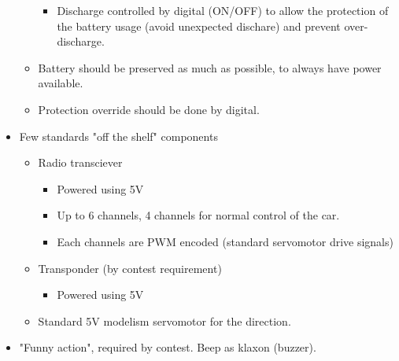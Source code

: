 \begin{itemize}
\begin{itemize}
\begin{itemize}
            \item Discharge controlled by digital (ON/OFF) to allow the protection of the battery usage (avoid unexpected dischare) and prevent over-discharge.
        \end{itemize}
        \item Battery should be preserved as much as possible, to always have power available.
        \item Protection override should be done by digital.
    \end{itemize}
    \item Few standards "off the shelf" components
    \begin{itemize}
        \item  Radio transciever
        \begin{itemize}
            \item Powered using 5V
            \item Up to 6 channels, 4 channels for normal control of the car.
            \item Each channels are PWM encoded (standard servomotor drive signals)
        \end{itemize}
        \item Transponder (by contest requirement)
        \begin{itemize}
            \item Powered using 5V
        \end{itemize}
        \item Standard 5V modelism servomotor for the direction.
    \end{itemize}
    \item "Funny action", required by contest. Beep as klaxon (buzzer).
    
    
\end{itemize}